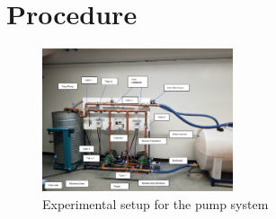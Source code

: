 

\section{Procedure}
\begin{figure}[h]
    \centering
    \includegraphics[width=0.5\textwidth]{Sections/Figures/Experimental Setup.jpg}
    \caption{Experimental setup for the pump system}
\end{figure}
